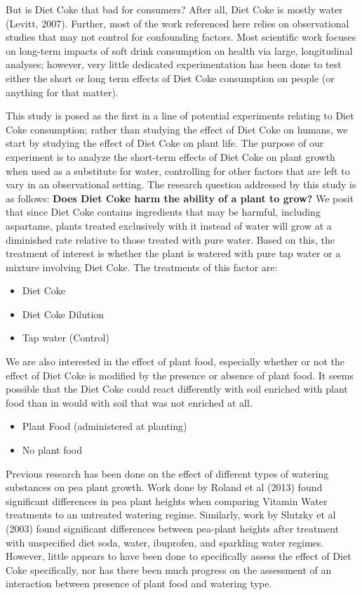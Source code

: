 \documentclass[1p,12pt]{elsarticle}\usepackage[]{graphicx}\usepackage[]{color}
\begin{document}
But is Diet Coke that bad for consumers? After all, Diet Coke is mostly water (Levitt, 2007). Further, most of the work referenced here relies on observational studies that may not control for confounding factors.  Most scientific work focuses on long-term impacts of soft drink consumption on health via large, longitudinal analyses; however, very little dedicated experimentation has been done to test either the short or long term effects of Diet Coke consumption on people (or anything for that matter). 

This study is posed as the first in a line of potential experiments relating to Diet Coke consumption; rather than studying the effect of Diet Coke on humans, we start by studying the effect of Diet Coke on plant life. The purpose of our experiment is to analyze the short-term effects of Diet Coke on plant growth when used as a substitute for water, controlling for other factors that are left to vary in an observational setting. The research question addressed by this study is as follows: \textbf{Does Diet Coke harm the ability of a plant to grow?} We posit that since Diet Coke contains ingredients that may be harmful, including aspartame, plants treated exclusively with it instead of water will grow at a diminished rate relative to those treated with pure water. Based on this, the treatment of interest is whether the plant is watered with pure tap water or a mixture involving Diet Coke.  The treatments of this factor are:

\begin{itemize}
\item Diet Coke
\item Diet Coke Dilution 
\item Tap water (Control)
\end{itemize}

We are also interested in the effect of plant food,  especially whether or not the effect of Diet Coke is modified by the presence or absence of plant food.  It seems possible that the Diet Coke could react differently with soil enriched with plant food than in would with soil that was not enriched at all. 

\begin{itemize}
\item Plant Food (administered at planting)
\item No plant food
\end{itemize}

Previous research has been done on the effect of different types of watering substances on pea plant growth. Work done by Roland et al (2013) found significant differences in pea plant heights when comparing Vitamin Water treatments to an untreated watering regime. Similarly, work by Slutzky et al (2003) found significant differences between pea-plant heights after treatment with unspecified diet soda, water, ibuprofen, and sparkling water regimes. However, little appears to have been done to specifically assess the effect of Diet Coke specifically, nor has there been much progress on the assessment of an interaction between presence of plant food and watering type.   
\end{document}

